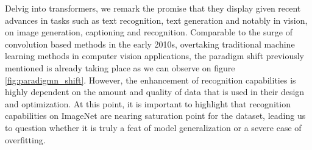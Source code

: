 \noindent Delvig into transformers, we remark the promise that they display 
given recent advances in tasks such as text recognition, text generation and notably in vision, 
on image generation, captioning and recognition. Comparable to the surge of convolution 
based methods in the early 2010s, overtaking traditional machine learning methods in computer 
vision applications, the paradigm shift previously mentioned is already taking place as 
we can observe on figure \autoref{fig:paradigmn_shift}. However, the enhancement of recognition 
capabilities is highly dependent on the amount and quality of data that is used in their 
design and optimization. At this point, it is important to highlight that recognition capabilities 
on ImageNet are nearing saturation point for the dataset, leading us to question whether it is 
truly a feat of model generalization or a severe case of overfitting.

